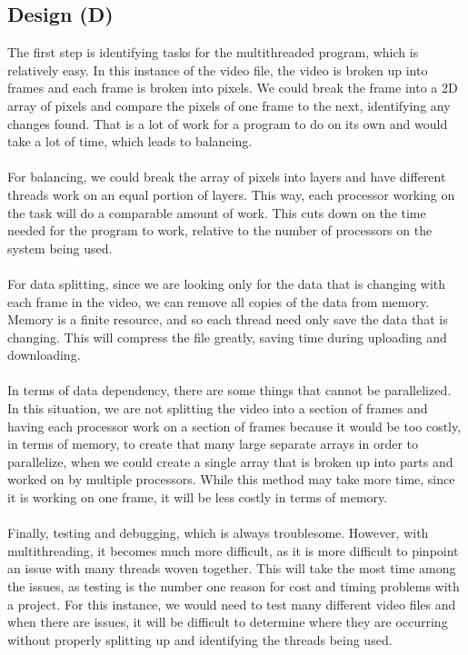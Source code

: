 \documentclass[12pt]{article}
\begin{document}
        \subsection{Design (D)}
        The first step is identifying tasks for the multithreaded program, which is relatively easy. In this instance of the video file, the video is broken up into 
        frames and each frame is broken into pixels. We could break the frame into a 2D array of pixels and compare the pixels of one frame to the next, identifying 
        any changes found. That is a lot of work for a program to do on its own and would take a lot of time, which leads to balancing.\\
        \\
        For balancing, we could break the array of pixels into layers and have different threads work on an equal portion of layers. This way, each processor working 
        on the task will do a comparable amount of work. This cuts down on the time needed for the program to work, relative to the number of processors on the system 
        being used. \\
        \\
        For data splitting, since we are looking only for the data that is changing with each frame in the video, we can remove all copies of the data from memory. 
        Memory is a finite resource, and so each thread need only save the data that is changing. This will compress the file greatly, saving time during uploading 
        and downloading. \\
        \\
        In terms of data dependency, there are some things that cannot be parallelized. In this situation, we are not splitting the video into a section of frames and 
        having each processor work on a section of frames because it would be too costly, in terms of memory, to create that many large separate arrays in order to 
        parallelize, when we could create a single array that is broken up into parts and worked on by multiple processors. While this method may take more time, since 
        it is working on one frame, it will be less costly in terms of memory. \\
        \\
        Finally, testing and debugging, which is always troublesome. However, with multithreading, it becomes much more difficult, as it is more difficult to pinpoint an 
        issue with many threads woven together. This will take the most time among the issues, as testing is the number one reason for cost and timing problems with a project. 
        For this instance, we would need to test many different video files and when there are issues, it will be difficult to determine where they are occurring without 
        properly splitting up and identifying the threads being used. \\
        \\
\end{document}

